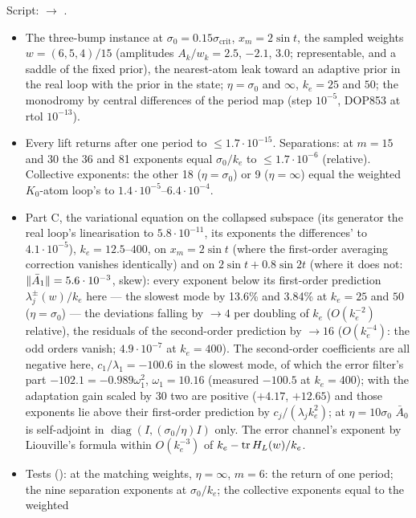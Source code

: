 Script:  $\to$ .
\begin{itemize}
  \item The three-bump instance at $\sigma_0=0.15\sigma_{\mathrm{crit}}$, $x_m=2\sin t$, the sampled weights
    $w=(6,5,4)/15$ (amplitudes $A_k/w_k=2.5$, $-2.1$, $3.0$; representable, and a saddle of the fixed prior), the
    nearest-atom leak toward an adaptive prior in the real loop with the prior in the state; $\eta=\sigma_0$ and
    $\infty$, $k_e=25$ and $50$; the monodromy by central differences of the period map (step $10^{-5}$, DOP853 at
    rtol $10^{-13}$).
  \item Every lift returns after one period to $\le1.7\cdot10^{-15}$. Separations: at $m=15$ and $30$ the 36 and 81
    exponents equal $\sigma_0/k_e$ to $\le1.7\cdot10^{-6}$ (relative). Collective exponents: the other 18
    ($\eta=\sigma_0$) or 9 ($\eta=\infty$) equal the weighted $K_0$-atom loop's to $1.4\cdot10^{-5}$--$6.4\cdot10^{-4}$.
  \item Part C, the variational equation on the collapsed subspace (its generator the real loop's linearisation to
    $5.8\cdot10^{-11}$, its exponents the differences' to $4.1\cdot10^{-5}$), $k_e=12.5$--$400$, on $x_m=2\sin t$ (where
    the first-order averaging correction vanishes identically) and on $2\sin t+0.8\sin2t$ (where it does not:
    $\lVert \bar A_1\rVert=5.6\cdot10^{-3}$, skew): every exponent below its first-order prediction $\lambda_j^\pm(w)/k_e$
    here --- the slowest mode by 13.6\% and 3.84\% at $k_e=25$ and $50$ ($\eta=\sigma_0$) --- the deviations falling by
    $\to4$ per doubling of $k_e$ ($O(k_e^{-2})$ relative), the residuals of the second-order prediction by $\to16$
    ($O(k_e^{-4})$: the odd orders vanish; $4.9\cdot10^{-7}$ at $k_e=400$). The second-order coefficients are all
    negative here, $c_1/\lambda_1=-100.6$ in the slowest mode, of which the error filter's part
    $-102.1=-0.989\omega_1^2$, $\omega_1=10.16$ (measured $-100.5$ at $k_e=400$); with the adaptation gain scaled by
    30 two are positive ($+4.17$, $+12.65$) and those exponents lie above their first-order prediction by
    $c_j/(\lambda_jk_e^2)$; at $\eta=10\sigma_0$ $\bar A_0$ is self-adjoint in $\operatorname{diag}(I,(\sigma_0/\eta)I)$
    only. The error channel's exponent by Liouville's formula within $O(k_e^{-3})$ of $k_e-\operatorname{tr} H_L(w)/k_e$.
  \item Tests (): at the matching weights, $\eta=\infty$, $m=6$: the return of one
    period; the nine separation exponents at $\sigma_0/k_e$; the collective exponents equal to the weighted

\end{itemize}
